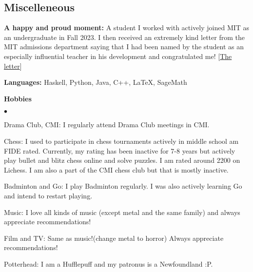 \documentclass[margin,line, 10pt]{res}
\newenvironment{list2}{
  \begin{list}{$\bullet$}{%
      \setlength{\itemsep}{0in}
      \setlength{\parsep}{0in} \setlength{\parskip}{0in}
      \setlength{\topsep}{0in} \setlength{\partopsep}{0in} 
      \setlength{\leftmargin}{0.2in}}}{\end{list}}
\begin{document}
\begin{resume}
\section{\sc Miscelleneous}

{\bf A happy and proud moment:} A student I worked with actively joined MIT as an undergraduate in Fall 2023. I then received an extremely kind letter from the MIT admissions department saying that I had been named by the student as an especially influential teacher in his development and congratulated me! \hfill [\href{https://www.dropbox.com/scl/fi/3qgucmmeimm4omc644ikz/mit_atul.jpg?rlkey=mflk16ps5md13whz80o50t2yj&dl=0}{The letter}]

\vspace*{0.1mm}
{\bf Languages:} Haskell, Python, Java, C++, \LaTeX, SageMath

\vspace*{0.1mm}
{\bf Hobbies}
\begin{list2}
    \item Drama Club, CMI: I regularly attend Drama Club meetings in CMI.
    \item Chess: I used to participate in chess tournaments actively in middle school am FIDE rated. Currently, my rating has been inactive for 7-8 years but actively play bullet and blitz chess online and solve puzzles. I am rated around 2200 on Lichess. I am also a part of the CMI chess club but that is mostly inactive.
    \item Badminton and Go: I play Badminton regularly. I was also actively learning Go and intend to restart playing.
    \item Music: I love all kinds of music (except metal and the same family) and always appreciate recommendations!
    \item Film and TV: Same as music!(change metal to horror) Always appreciate recommendations!
    \item Potterhead: I am a Hufflepuff and my patronus is a Newfoundland :P.
\end{list2}



\end{resume}
\thispagestyle{lastpage}
\end{document}
